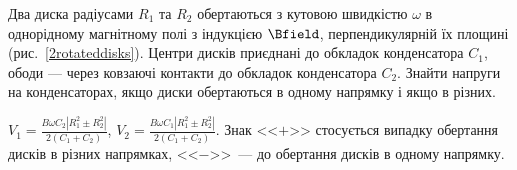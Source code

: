 \begin{problem}\label{prb:2rotateddisks}
Два диска радіусами $R_1$ та $R_2$ обертаються з кутовою швидкістю $\omega$ в однорідному магнітному полі з індукцією $\Bfield$, перпендикулярній їх площині (рис.~\ref{2rotateddisks}). Центри дисків приєднані до обкладок конденсатора $C_1$, ободи --- через ковзаючі контакти до обкладок конденсатора $C_2$. Знайти напруги на конденсаторах, якщо диски обертаються в одному напрямку і якщо в різних.
\begin{solution}
	$V_1  = \frac{B\omega C_2 \left| R_1^2 \pm R_2^2 \right| }{2(C_1 + C_2)}$, $V_2  = \frac{B\omega C_1 \left| R_1^2 \pm R_2^2 \right| }{2(C_1 + C_2)}$. Знак <<$+$>> стосується випадку обертання дисків
	в різних напрямках, <<$-$>>~--- до обертання дисків в одному напрямку.
\end{solution}
\end{problem}

